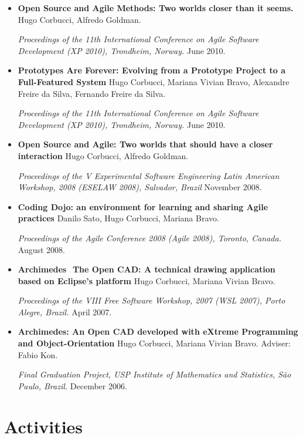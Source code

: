 \documentclass[letter,10pt]{article}
\begin{document}
\begin{itemize}
\item \textbf{Open Source and Agile Methods: Two worlds closer than it
    seems.} Hugo Corbucci, Alfredo Goldman.

  \textit{Proceedings of the 11th International Conference on Agile
    Software Development (XP 2010), Trondheim, Norway.} June 2010.

\item \textbf{Prototypes Are Forever: Evolving from a Prototype
    Project to a Full-Featured System} Hugo Corbucci, Mariana Vivian
  Bravo, Alexandre Freire da Silva, Fernando Freire da Silva.

  \textit{Proceedings of the 11th International Conference on Agile
    Software Development (XP 2010), Trondheim, Norway.} June 2010.

\item \textbf{Open Source and Agile: Two worlds that should have a
    closer interaction} Hugo Corbucci, Alfredo Goldman.

  \textit{Proceedings of the V Experimental Software Engineering Latin
    American Workshop, 2008 (ESELAW 2008), Salvador, Brazil} November
  2008.

\item \textbf{Coding Dojo: an environment for learning and sharing
    Agile practices} Danilo Sato, Hugo Corbucci, Mariana Bravo.

  \textit{Proceedings of the Agile Conference 2008 (Agile 2008),
    Toronto, Canada.} August 2008.

\item \textbf{Archimedes ­ The Open CAD: A technical drawing
    application based on Eclipse's platform} Hugo Corbucci, Mariana
  Vivian Bravo.

  \textit{Proceedings of the VIII Free Software Workshop, 2007 (WSL
    2007), Porto Alegre, Brazil.} April 2007.

\item \textbf{Archimedes: An Open CAD developed with eXtreme
    Programming and Object-Orientation} Hugo Corbucci, Mariana Vivian
  Bravo. Adviser: Fabio Kon.

  \textit{Final Graduation Project, USP Institute of Mathematics and
    Statistics, São Paulo, Brazil.} December 2006.
\end{itemize}

\section{Activities}
\end{document}
